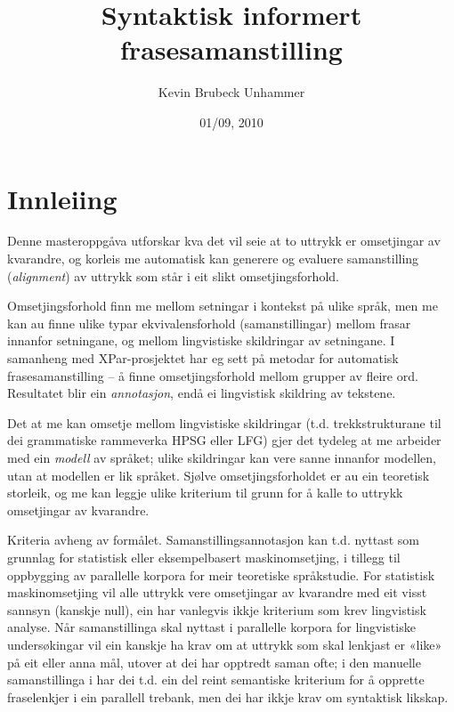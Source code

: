 \documentclass[11pt,a4paper,oneside,draft]{book}
\title{Syntaktisk informert frasesamanstilling }
\author{Kevin Brubeck Unhammer}
\date{01/09, 2010}
\begin{document}
\maketitle

\setcounter{tocdepth}{4}
\tableofcontents
\vspace*{1cm}



\chapter{Innleiing}
\label{sec-1}

\label{SEC:innleiing}


Denne masteroppgåva utforskar kva det vil seie at to uttrykk er
omsetjingar av kvarandre, og korleis me automatisk kan generere og
evaluere samanstilling (\emph{alignment}) av uttrykk som
står i eit slikt omsetjingsforhold. 

Omsetjingsforhold finn me mellom setningar i kontekst på ulike språk,
men me kan au finne ulike typar ekvivalensforhold (samanstillingar)
mellom frasar innanfor setningane, og mellom lingvistiske
skildringar av setningane. I samanheng med XPar-prosjektet
\citep{xpar2008rcn} har eg sett på metodar for automatisk
frasesamanstilling – å finne omsetjingsforhold mellom grupper av
fleire ord. Resultatet blir ein \emph{annotasjon}, endå ei lingvistisk
skildring av tekstene.



Det at me kan omsetje mellom lingvistiske skildringar
(t.d. trekkstrukturane til dei grammatiske rammeverka HPSG eller LFG)
gjer det tydeleg at me arbeider med ein \emph{modell} av språket; ulike
skildringar kan vere sanne innanfor modellen, utan at modellen er lik
språket. Sjølve omsetjingsforholdet er au ein teoretisk storleik, og
me kan leggje ulike kriterium til grunn for å kalle to uttrykk
omsetjingar av kvarandre.

Kriteria avheng av formålet. Samanstillingsannotasjon kan t.d. nyttast
som grunnlag for statistisk eller eksempelbasert maskinomsetjing, i
tillegg til oppbygging av parallelle korpora for meir teoretiske
språkstudie.  For statistisk maskinomsetjing vil alle uttrykk vere
omsetjingar av kvarandre med eit visst sannsyn (kanskje null), ein
har vanlegvis ikkje kriterium som krev lingvistisk analyse. Når
samanstillinga skal nyttast i parallelle korpora for lingvistiske
undersøkingar vil ein kanskje ha krav om at uttrykk som skal lenkjast
er «like» på eit eller anna mål, utover at dei har opptredt saman
ofte; i den manuelle samanstillinga i \citet{samuelsson2006pap} har
dei t.d. ein del reint semantiske kriterium for å opprette
fraselenkjer i ein parallell trebank, men dei har ikkje krav om
syntaktisk likskap.
\end{document}
